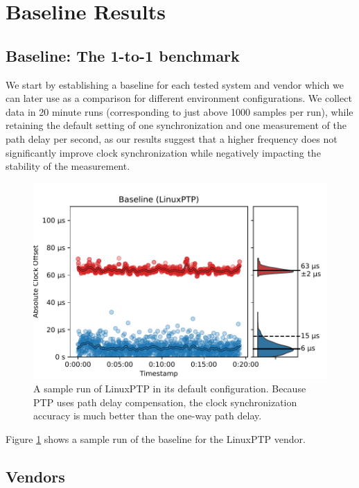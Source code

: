 
\section{Baseline Results}

\subsection{Baseline: The 1-to-1 benchmark}

We start by establishing a baseline for each tested system and vendor which we can later use as a comparison for different environment configurations. We collect data in 20 minute runs (corresponding to just above 1000 samples per run), while retaining the default setting of one synchronization and one measurement of the path delay per second, as our results suggest that a higher frequency does not significantly improve clock synchronization while negatively impacting the stability of the measurement.

\begin{figure}
    \includegraphics[width=\linewidth]{res/generated/baseline/sample.pdf}
    \caption{A sample run of LinuxPTP in its default configuration. Because PTP uses path delay compensation, the clock synchronization accuracy is much better than the one-way path delay.}
    \label{fig:baseline_sample}
\end{figure}

Figure \ref{fig:baseline_sample} shows a sample run of the baseline for the LinuxPTP vendor.

\subsection{Vendors}


